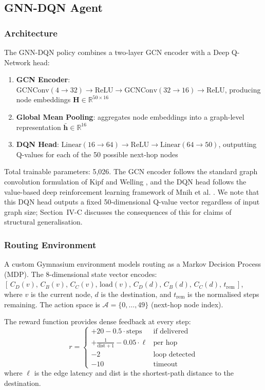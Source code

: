 \documentclass[conference]{IEEEtran}
\begin{document}
\subsection{GNN-DQN Agent}

\subsubsection{Architecture}
The GNN-DQN policy combines a two-layer GCN encoder with a
Deep Q-Network head:
\begin{enumerate}
    \item \textbf{GCN Encoder}:
          $\text{GCNConv}(4 \rightarrow 32) \rightarrow \text{ReLU}
          \rightarrow \text{GCNConv}(32 \rightarrow 16)
          \rightarrow \text{ReLU}$,
          producing node embeddings
          $\mathbf{H} \in \mathbb{R}^{50 \times 16}$     \item \textbf{Global Mean Pooling}: aggregates node
          embeddings into a graph-level representation
          $\bar{\mathbf{h}} \in \mathbb{R}^{16}$     \item \textbf{DQN Head}:
          $\text{Linear}(16 \rightarrow 64) \rightarrow
          \text{ReLU} \rightarrow \text{Linear}(64 \rightarrow 50)$,
          outputting Q-values for each of the 50 possible
          next-hop nodes
\end{enumerate}
Total trainable parameters: 5,026. The GCN encoder follows the
standard graph convolution formulation of Kipf and Welling
\cite{kipf2017}, and the DQN head follows the value-based deep
reinforcement learning framework of Mnih et al. \cite{mnih2015}.
We note that this DQN head outputs a fixed 50-dimensional
Q-value vector regardless of input graph size; Section~IV-C
discusses the consequences of this for claims of structural
generalisation.

\subsubsection{Routing Environment}
A custom Gymnasium environment models routing as a Markov
Decision Process (MDP). The 8-dimensional state vector encodes:
 $[\,C_D(v),\, C_B(v),\, C_C(v),\, \text{load}(v),\,
C_D(d),\, C_B(d),\, C_C(d),\, t_{\text{rem}}\,]$,
where $v$ is the current node, $d$ is the destination, and
 $t_{\text{rem}}$ is the normalised steps remaining. The action
space is $\mathcal{A} = \{0, \ldots, 49\}$ (next-hop node index).

The reward function provides dense feedback at every step:
\begin{equation}
r = \begin{cases}
+20 - 0.5 \cdot \text{steps} & \text{if delivered} \\
+\frac{1}{\text{dist}+1} - 0.05 \cdot \ell & \text{per hop} \\
-2 & \text{loop detected} \\
-10 & \text{timeout}
\end{cases}
\end{equation}
where $\ell$ is the edge latency and dist is the shortest-path
distance to the destination.
\end{document}
